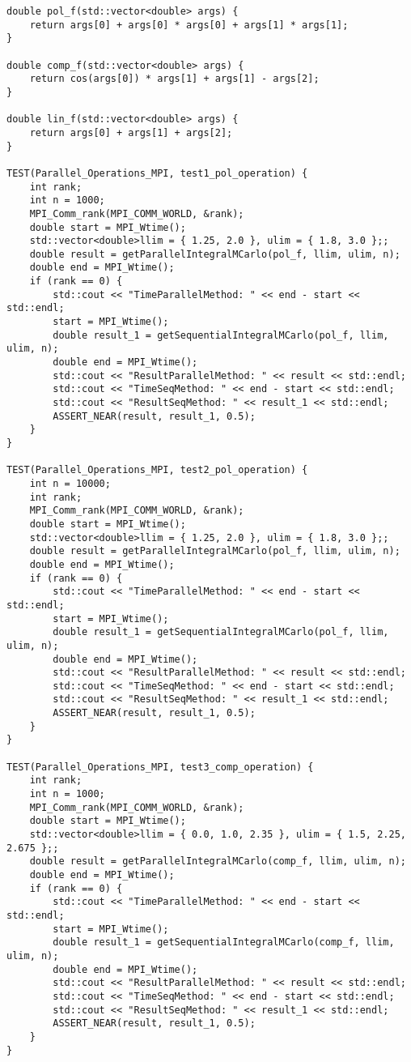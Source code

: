 \documentclass{report}
\begin{document}
\begin{lstlisting}
double pol_f(std::vector<double> args) {
    return args[0] + args[0] * args[0] + args[1] * args[1];
}

double comp_f(std::vector<double> args) {
    return cos(args[0]) * args[1] + args[1] - args[2];
}

double lin_f(std::vector<double> args) {
    return args[0] + args[1] + args[2];
}

TEST(Parallel_Operations_MPI, test1_pol_operation) {
    int rank;
    int n = 1000;
    MPI_Comm_rank(MPI_COMM_WORLD, &rank);
    double start = MPI_Wtime();
    std::vector<double>llim = { 1.25, 2.0 }, ulim = { 1.8, 3.0 };;
    double result = getParallelIntegralMCarlo(pol_f, llim, ulim, n);
    double end = MPI_Wtime();
    if (rank == 0) {
        std::cout << "TimeParallelMethod: " << end - start << std::endl;
        start = MPI_Wtime();
        double result_1 = getSequentialIntegralMCarlo(pol_f, llim, ulim, n);
        double end = MPI_Wtime();
        std::cout << "ResultParallelMethod: " << result << std::endl;
        std::cout << "TimeSeqMethod: " << end - start << std::endl;
        std::cout << "ResultSeqMethod: " << result_1 << std::endl;
        ASSERT_NEAR(result, result_1, 0.5);
    }
}

TEST(Parallel_Operations_MPI, test2_pol_operation) {
    int n = 10000;
    int rank;
    MPI_Comm_rank(MPI_COMM_WORLD, &rank);
    double start = MPI_Wtime();
    std::vector<double>llim = { 1.25, 2.0 }, ulim = { 1.8, 3.0 };;
    double result = getParallelIntegralMCarlo(pol_f, llim, ulim, n);
    double end = MPI_Wtime();
    if (rank == 0) {
        std::cout << "TimeParallelMethod: " << end - start << std::endl;
        start = MPI_Wtime();
        double result_1 = getSequentialIntegralMCarlo(pol_f, llim, ulim, n);
        double end = MPI_Wtime();
        std::cout << "ResultParallelMethod: " << result << std::endl;
        std::cout << "TimeSeqMethod: " << end - start << std::endl;
        std::cout << "ResultSeqMethod: " << result_1 << std::endl;
        ASSERT_NEAR(result, result_1, 0.5);
    }
}

TEST(Parallel_Operations_MPI, test3_comp_operation) {
    int rank;
    int n = 1000;
    MPI_Comm_rank(MPI_COMM_WORLD, &rank);
    double start = MPI_Wtime();
    std::vector<double>llim = { 0.0, 1.0, 2.35 }, ulim = { 1.5, 2.25, 2.675 };;
    double result = getParallelIntegralMCarlo(comp_f, llim, ulim, n);
    double end = MPI_Wtime();
    if (rank == 0) {
        std::cout << "TimeParallelMethod: " << end - start << std::endl;
        start = MPI_Wtime();
        double result_1 = getSequentialIntegralMCarlo(comp_f, llim, ulim, n);
        double end = MPI_Wtime();
        std::cout << "ResultParallelMethod: " << result << std::endl;
        std::cout << "TimeSeqMethod: " << end - start << std::endl;
        std::cout << "ResultSeqMethod: " << result_1 << std::endl;
        ASSERT_NEAR(result, result_1, 0.5);
    }
}


\end{lstlisting}
\end{document}
